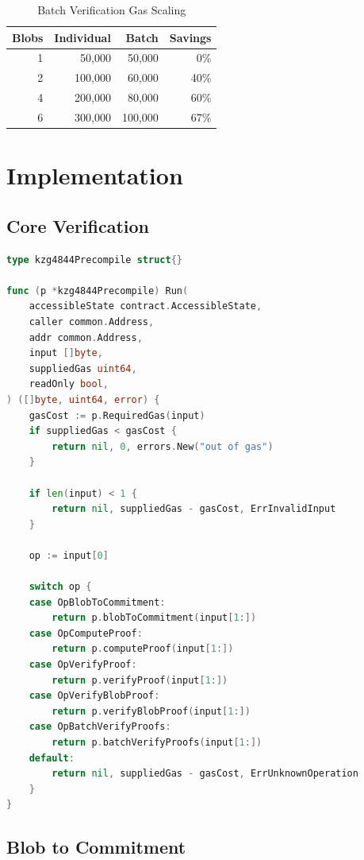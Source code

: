 \documentclass[11pt,a4paper]{article}
\theoremstyle{definition}
\begin{document}
\begin{table}[h]
\centering
\caption{Batch Verification Gas Scaling}
\begin{tabular}{rrrr}
\toprule
Blobs & Individual & Batch & Savings \\
\midrule
1 & 50,000 & 50,000 & 0\% \\
2 & 100,000 & 60,000 & 40\% \\
4 & 200,000 & 80,000 & 60\% \\
6 & 300,000 & 100,000 & 67\% \\
\bottomrule
\end{tabular}
\end{table}

\section{Implementation}

\subsection{Core Verification}

\begin{lstlisting}[language=Go, caption={KZG4844 Precompile Implementation}]
type kzg4844Precompile struct{}

func (p *kzg4844Precompile) Run(
    accessibleState contract.AccessibleState,
    caller common.Address,
    addr common.Address,
    input []byte,
    suppliedGas uint64,
    readOnly bool,
) ([]byte, uint64, error) {
    gasCost := p.RequiredGas(input)
    if suppliedGas < gasCost {
        return nil, 0, errors.New("out of gas")
    }

    if len(input) < 1 {
        return nil, suppliedGas - gasCost, ErrInvalidInput
    }

    op := input[0]

    switch op {
    case OpBlobToCommitment:
        return p.blobToCommitment(input[1:])
    case OpComputeProof:
        return p.computeProof(input[1:])
    case OpVerifyProof:
        return p.verifyProof(input[1:])
    case OpVerifyBlobProof:
        return p.verifyBlobProof(input[1:])
    case OpBatchVerifyProofs:
        return p.batchVerifyProofs(input[1:])
    default:
        return nil, suppliedGas - gasCost, ErrUnknownOperation
    }
}
\end{lstlisting}

\subsection{Blob to Commitment}
\end{document}
